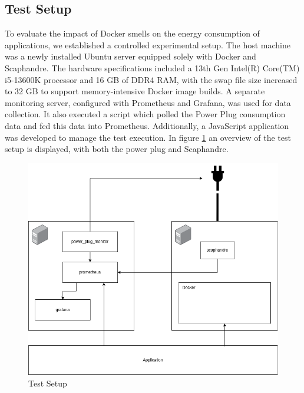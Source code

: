 \documentclass[conference]{IEEEtran}
\begin{document}
\subsection{Test Setup}
To evaluate the impact of Docker smells on the energy consumption of applications, we established a controlled experimental setup. The host machine was a newly installed Ubuntu server equipped solely with Docker and Scaphandre. The hardware specifications included a 13th Gen Intel(R) Core(TM) i5-13600K processor and 16 GB of DDR4 RAM, with the swap file size increased to 32 GB to support memory-intensive Docker image builds. A separate monitoring server, configured with Prometheus and Grafana, was used for data collection. It also executed a script which polled the Power Plug consumption data and fed this data into Prometheus. Additionally, a JavaScript application was developed to manage the test execution. In figure \ref{fig:test_setup} an overview of the test setup is displayed, with both the power plug and Scaphandre. 

\begin{figure}[htbp]
    \centering
    \includegraphics[width=\linewidth]{graphics/setup_double.drawio.png}
    \caption{Test Setup}
    \label{fig:test_setup}
\end{figure}
\end{document}

